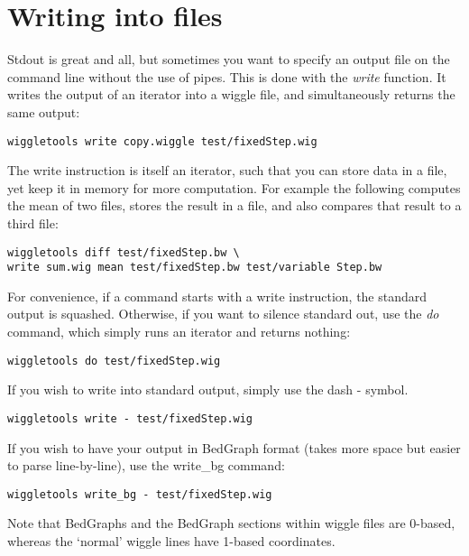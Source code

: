 \documentclass[12pt]{article}
\begin{document}
\section{Writing into files}

Stdout is great and all, but sometimes you want to specify an output file on the command line without the use of pipes. This is done with the \emph{write} function. It writes the output of an iterator into a wiggle file, and simultaneously returns the same output:

\begin{verbatim}
wiggletools write copy.wiggle test/fixedStep.wig 
\end{verbatim}

The write instruction is itself an iterator, such that you can store data in a file, yet keep it in memory for more computation. For example the following computes the mean of two files, stores the result in a file, and also compares that result to a third file:

\begin{verbatim}
wiggletools diff test/fixedStep.bw \
write sum.wig mean test/fixedStep.bw test/variable Step.bw 
\end{verbatim}

For convenience, if a command starts with a write instruction, the standard output is squashed. Otherwise, if you want to silence standard out, use the \emph{do} command, which simply runs an iterator and returns nothing: 

\begin{verbatim}
wiggletools do test/fixedStep.wig 
\end{verbatim}

If you wish to write into standard output, simply use the dash - symbol.

\begin{verbatim}
wiggletools write - test/fixedStep.wig 
\end{verbatim}

If you wish to have your output in BedGraph format (takes more space but easier to parse line-by-line), use the write\_bg command:

\begin{verbatim}
wiggletools write_bg - test/fixedStep.wig 
\end{verbatim}

Note that BedGraphs and the BedGraph sections within wiggle files are 0-based, whereas the `normal' wiggle lines have 1-based coordinates.
\end{document}
